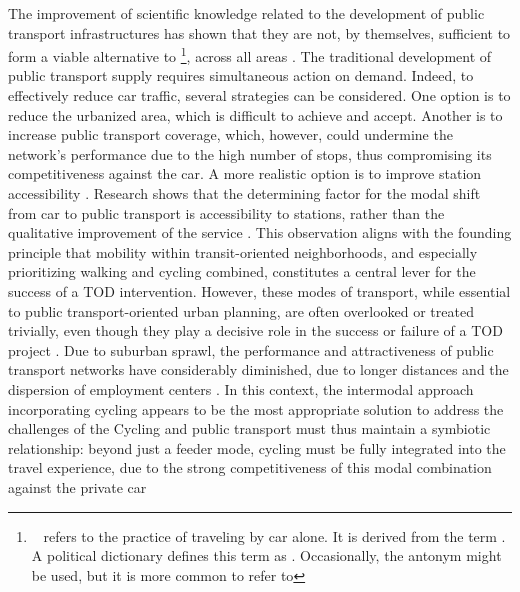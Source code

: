 \begin{refsegment}
The improvement of scientific knowledge related to the development of public transport infrastructures has shown that they are not, by themselves, sufficient to form a viable alternative to \footnote{~
     refers to the practice of traveling by car alone. It is derived from the term . A political dictionary defines this term as  \textcolor{blue}{\autocite{carfreeEN_dictionnaire_2008}}. Occasionally, the antonym  might be used, but it is more common to refer to 
}, across all areas \textcolor{blue}{\autocite[8]{molino_pratiques_2015}}. The traditional development of public transport supply requires simultaneous action on demand. Indeed, to effectively reduce car traffic, several strategies can be considered. One option is to reduce the urbanized area, which is difficult to achieve and accept. Another is to increase public transport coverage, which, however, could undermine the network's performance due to the high number of stops, thus compromising its competitiveness against the car. A more realistic option is to improve station accessibility \textcolor{blue}{\autocite[10]{verbavatz_critical_2019}}. Research shows that the determining factor for the modal shift from car to public transport is accessibility to stations, rather than the qualitative improvement of the service \textcolor{blue}{\autocite[146]{brons_access_2009}}. This observation aligns with the founding principle that mobility within transit-oriented neighborhoods, and especially prioritizing walking and cycling combined, constitutes a central lever for the success of a \acrshort{TOD} intervention. However, these modes of transport, while essential to public transport-oriented urban planning, are often overlooked or treated trivially, even though they play a decisive role in the success or failure of a \acrshort{TOD} project \textcolor{blue}{\autocite[34]{schlossberg_comparing_2004}}. Due to suburban sprawl, the performance and attractiveness of public transport networks have considerably diminished, due to longer distances and the dispersion of employment centers \textcolor{blue}{\autocite[13]{bentayou_transit-oriented_2015}}. In this context, the intermodal approach incorporating cycling appears to be the most appropriate solution to address the challenges of the  Cycling and public transport must thus maintain a symbiotic relationship: beyond just a feeder mode, cycling must be fully integrated into the travel experience, due to the strong competitiveness of this modal combination against the private car \textcolor{blue}{\autocite[208]{kager_characterisation_2016}}
\end{refsegment}
